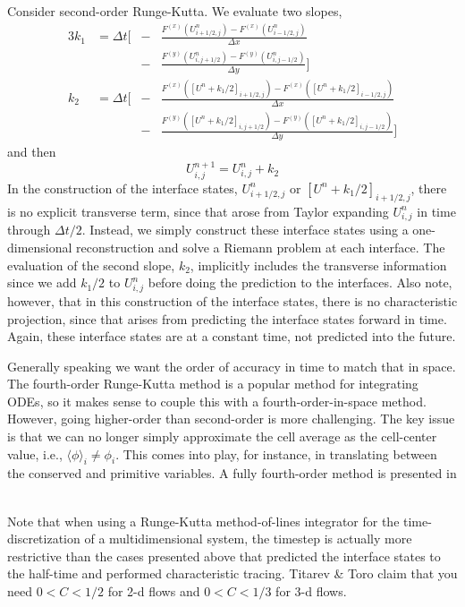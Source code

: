 Consider
second-order Runge-Kutta.  We evaluate two slopes,
\begin{alignat}{3}
k_1 &= \Delta t \bigg [ &-&\frac{F^{(x)}(U^n_{i+1/2,j})
                               - F^{(x)}(U^n_{i-1/2,j})}{\Delta x} \nonumber \\
    &\,                 &-&\frac{F^{(y)}(U^n_{i,j+1/2})
                               - F^{(y)}(U^n_{i,j-1/2})}{\Delta y} \bigg ] \\
k_2 &= \Delta t \bigg [ &-&\frac{F^{(x)}([U^n + k_1/2]_{i+1/2,j})
                               - F^{(x)}([U^n + k_1/2]_{i-1/2,j})}{\Delta x} \nonumber \\
    &\,                 &-&\frac{F^{(y)}([U^n + k_1/2]_{i,j+1/2})
                               - F^{(y)}([U^n + k_1/2]_{i,j-1/2})}{\Delta y} \bigg ]
\end{alignat}
and then
\begin{equation}
U^{n+1}_{i,j} = U^n_{i,j} + k_2
\end{equation}
In the construction of the interface states, $U^n_{i+1/2,j}$ or $[U^n
+ k_1/2]_{i+1/2,j}$, there is no explicit transverse term, since that
arose from Taylor expanding $U^n_{i,j}$ in time through $\Delta t/2$.
Instead, we simply construct these interface states using a
one-dimensional reconstruction and solve a Riemann problem at each
interface.  The evaluation of the second slope, $k_2$, implicitly
includes the transverse information since we add $k_1/2$ to
$U^n_{i,j}$ before doing the prediction to the interfaces.  Also note,
however, that in this construction of the interface states, there is
no characteristic projection, since that arises from predicting the
interface states forward in time.  Again, these interface states are
at a constant time, not predicted into the future.

Generally speaking we want the order of accuracy in time to match that
in space.  The fourth-order Runge-Kutta method is a popular method for
integrating ODEs, so it makes sense to couple this with a
fourth-order-in-space method.  However, going higher-order than
second-order is more challenging.  The key issue is that we can no
longer simply approximate the cell average as the cell-center value,
i.e., $\langle \phi\rangle_i \ne \phi_i$.  This comes into play, for
instance, in translating between the conserved and primitive variables.
A fully fourth-order method is presented in ~\cite{mccorquodalecolella}

Note that when using a Runge-Kutta method-of-lines integrator for the
time-discretization of a multidimensional system, the timestep is
actually more restrictive than the cases presented above that
predicted the interface states to the half-time and performed
characteristic tracing.  Titarev \& Toro \cite{titarevtoro} claim that
you need $0 < C < 1/2$ for 2-d flows and $0 < C < 1/3$ for 3-d flows.

